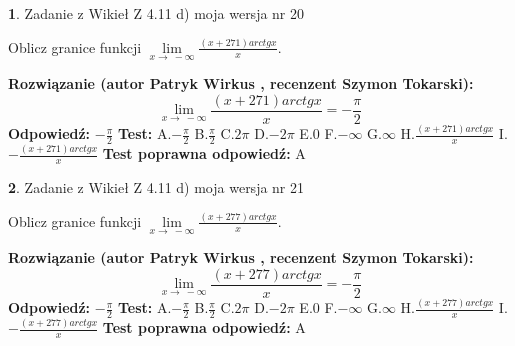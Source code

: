 \documentclass[12pt, a4paper]{article}
\theoremstyle{definition} %
\newtheorem{zad}{}
\newcommand{\zadStart}[1]{\begin{zad}#1\newline}
\newcommand{\zadStop}{\end{zad}}
\newcommand{\rozwStart}[2]{\noindent \textbf{Rozwiązanie (autor #1 , recenzent #2): }\newline}
\newcommand{\rozwStop}{\newline}
\newcommand{\odpStart}{\noindent \textbf{Odpowiedź:}\newline}
\newcommand{\odpStop}{\newline}
\newcommand{\testStart}{\noindent \textbf{Test:}\newline}
\newcommand{\testStop}{\newline}
\newcommand{\kluczStart}{\noindent \textbf{Test poprawna odpowiedź:}\newline}
\newcommand{\kluczStop}{\newline}
\begin{document}
\zadStart{Zadanie z Wikieł Z 4.11 d) moja wersja nr 20}

Oblicz granice funkcji $\lim\limits_{x\to\ -\infty}\frac{(x+271)arctgx}{x}$.
\zadStop
\rozwStart{Patryk Wirkus}{Szymon Tokarski}
$$\lim\limits_{x\to\ -\infty}\frac{(x+271)arctgx}{x} = -\frac{\pi}{2}$$
\rozwStop
\odpStart
$-\frac{\pi}{2}$
\odpStop
\testStart
A.$-\frac{\pi}{2}$ B.$\frac{\pi}{2}$ C.$2\pi$ D.$-2\pi$ E.$0$ F.$-\infty$ G.$\infty$ H.$\frac{(x+271)arctgx}{x}$ I.$-\frac{(x+271)arctgx}{x}$
\testStop
\kluczStart
A
\kluczStop



\zadStart{Zadanie z Wikieł Z 4.11 d) moja wersja nr 21}

Oblicz granice funkcji $\lim\limits_{x\to\ -\infty}\frac{(x+277)arctgx}{x}$.
\zadStop
\rozwStart{Patryk Wirkus}{Szymon Tokarski}
$$\lim\limits_{x\to\ -\infty}\frac{(x+277)arctgx}{x} = -\frac{\pi}{2}$$
\rozwStop
\odpStart
$-\frac{\pi}{2}$
\odpStop
\testStart
A.$-\frac{\pi}{2}$ B.$\frac{\pi}{2}$ C.$2\pi$ D.$-2\pi$ E.$0$ F.$-\infty$ G.$\infty$ H.$\frac{(x+277)arctgx}{x}$ I.$-\frac{(x+277)arctgx}{x}$
\testStop
\kluczStart
A
\kluczStop
\end{document}
